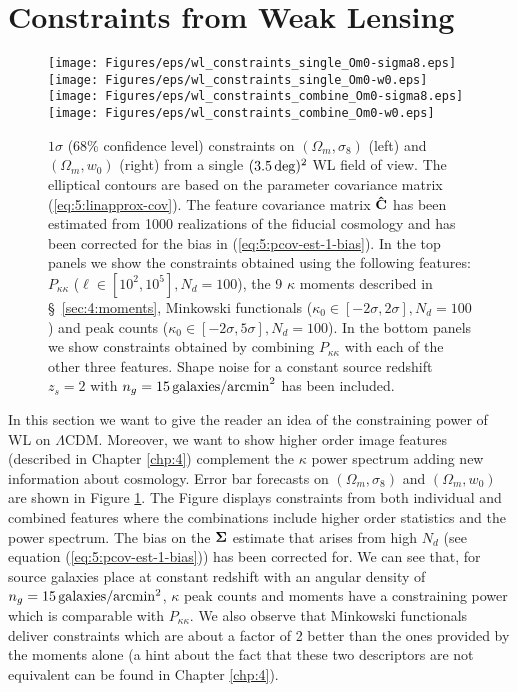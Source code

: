 \section{Constraints from Weak Lensing}
\label{sec:5:constraints}
%
\begin{figure}
\begin{center}
\texttt{[image: Figures/eps/wl\_constraints\_single\_Om0-sigma8.eps]} \texttt{[image: Figures/eps/wl\_constraints\_single\_Om0-w0.eps]}
\texttt{[image: Figures/eps/wl\_constraints\_combine\_Om0-sigma8.eps]} \texttt{[image: Figures/eps/wl\_constraints\_combine\_Om0-w0.eps]}
\end{center}
\caption{$1\sigma$ (68\% confidence level) constraints on $(\Omega_m,\sigma_8)$ (left) and $(\Omega_m,w_0)$ (right) from a single $(3.5\,{\rm deg})^2$ WL field of view. The elliptical contours are based on the parameter covariance matrix (\ref{eq:5:linapprox-cov}). The feature covariance matrix $\mathbf{\hat{C}}$ has been estimated from 1000 realizations of the fiducial cosmology and has been corrected for the bias in (\ref{eq:5:pcov-est-1-bias}). In the top panels we show the constraints obtained using the following features: $P_{\kappa\kappa}$ ($\ell \in [10^2,10^5],N_d=100$), the 9 $\kappa$ moments described in \S~\ref{sec:4:moments}, Minkowski functionals ($\kappa_0\in[-2\sigma,2\sigma], N_d=100$) and peak counts ($\kappa_0\in[-2\sigma,5\sigma], N_d=100$). In the bottom panels we show constraints obtained by combining $P_{\kappa\kappa}$ with each of the other three features. Shape noise for a constant source redshift $z_s=2$ with $n_g=15\,{\rm galaxies/arcmin}^2$ has been included.}
\label{fig:5:wlconstraints}
\end{figure}
%
In this section we want to give the reader an idea of the constraining power of WL on $\Lambda$CDM. Moreover, we want to show higher order image features (described in Chapter \ref{chp:4}) complement the $\kappa$ power spectrum adding new information about cosmology. Error bar forecasts on $(\Omega_m,\sigma_8)$ and $(\Omega_m,w_0)$ are shown in Figure \ref{fig:5:wlconstraints}. The Figure displays constraints from both individual and combined features where the combinations include higher order statistics and the power spectrum. The bias on the $\mathbf{\Sigma}$ estimate that arises from high $N_d$ (see equation (\ref{eq:5:pcov-est-1-bias})) has been corrected for. We can see that, for source galaxies place at constant redshift with an angular density of $n_g=15\,{\rm galaxies/arcmin^2}$, $\kappa$ peak counts and moments have a constraining power which is comparable with $P_{\kappa\kappa}$. We also observe that Minkowski functionals deliver constraints which are about a factor of 2 better than the ones provided by the moments alone (a hint about the fact that these two descriptors are not equivalent can be found in Chapter \ref{chp:4}).

